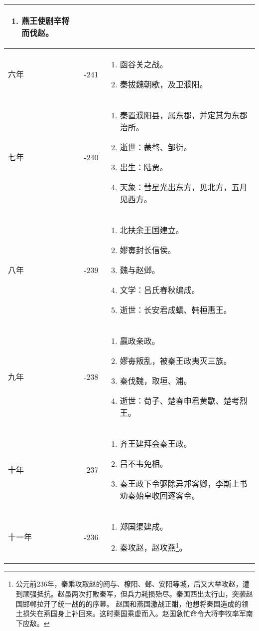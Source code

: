 \begin{longtable}{|>{\centering\scriptsize}m{2em}|>{\centering\scriptsize}m{1.3em}|>{\centering}m{8.8em}|}
\begin{enumerate}
  \item 燕王使剧辛将而伐赵。
  \end{enumerate} \tabularnewline\hline
  六年 & -241 & \begin{enumerate}
    \tiny
  \item 函谷关之战。
  \item 秦拔魏朝歌，及卫濮阳。
  \end{enumerate} \tabularnewline\hline
  七年 & -240 & \begin{enumerate}
    \tiny
  \item 秦置濮阳县，属东郡，并定其为东郡治所。
  \item 逝世：蒙骜、邹衍。
  \item 出生：陆贾。
  \item 天象：彗星光出东方，见北方，五月见西方。
  \end{enumerate} \tabularnewline\hline
  八年 & -239 & \begin{enumerate}
    \tiny
  \item 北扶余王国建立。
  \item 嫪毐封长信侯。
  \item 魏与赵邺。
  \item 文学：吕氏春秋编成。
  \item 逝世：长安君成蟜、韩桓惠王。
  \end{enumerate} \tabularnewline\hline
  九年 & -238 & \begin{enumerate}
    \tiny
  \item 嬴政亲政。
  \item 嫪毐叛乱，被秦王政夷灭三族。
  \item 秦伐魏，取垣、浦。
  \item 逝世：荀子、楚春申君黄歇、楚考烈王。
  \end{enumerate} \tabularnewline\hline
  十年 & -237 & \begin{enumerate}
    \tiny
  \item 齐王建拜会秦王政。
  \item 吕不韦免相。
  \item 秦王政下令驱除异邦客卿，李斯上书劝秦始皇收回逐客令。
  \end{enumerate} \tabularnewline\hline
  十一年 & -236 & \begin{enumerate}
    \tiny
  \item 郑国渠建成。
  \item 秦攻赵，赵攻燕\footnote{公元前236年，秦乘攻取赵的阏与、橑阳、邺、安阳等城，后又大举攻赵，遭到顽强抵抗。赵虽两次打败秦军，但兵力耗损殆尽。秦国西出太行山，突袭赵国邯郸拉开了统一战的的序幕。 赵国和燕国激战正酣，他想将秦国造成的领土损失在燕国身上补回来。这时秦国乘虚而入。赵国急忙命令大将李牧率军南下应敌。}。

\end{enumerate}
\end{longtable}
